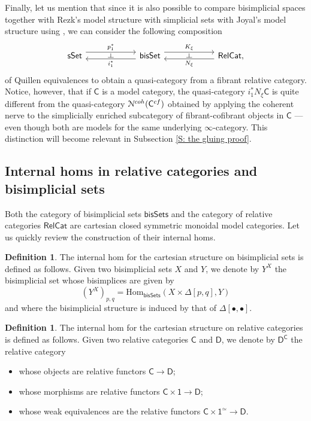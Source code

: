 \documentclass{proc-l}
\renewcommand{\mathcal}{\EuScript}
\theoremstyle{plain}
\theoremstyle{definition}
\newtheorem{definition}[{theorem}]{Definition}
\theoremstyle{remark}
\begin{document}
Finally, let us mention that since it is also possible to compare bisimplicial spaces together with Rezk's model structure with simplicial sets with Joyal's model structure using \cite{JoaylTierney07}, we can consider the following composition
\[
\begin{tikzcd}[column sep=5pc,row sep=3pc]
\mathsf{sSet}   \arrow[r, shift left=1.1ex, "p_1^*"{name=A}]
&\mathsf{bisSet} \arrow[r, shift left=1.1ex, "K_{\xi}"{name=F}] \arrow[l, shift left=.75ex, "i_1^*"{name=B}] & \mathsf{RelCat} , \arrow[l, shift left=.75ex, "N_{\xi}"{name=U}]
\arrow[phantom, from=F, to=U, , "\dashv" rotate=-90] \arrow[phantom, from=A, to=B, , "\dashv" rotate=-90]
\end{tikzcd}
\]
of Quillen equivalences to obtain a quasi-category from a fibrant relative category. Notice, however, that if $\mathsf{C}$ is a model category, the quasi-category $i_1^* N_\xi\mathsf{C}$ is quite different from the quasi-category $\mathcal{N}^{coh}(\mathsf{C}^{cf})$ obtained by applying the coherent nerve to the simplicially enriched subcategory of fibrant-cofibrant objects in $\mathsf{C}$ --- even though both are models for the same underlying $\infty$-category. This distinction will become relevant in Subsection \ref{S: the gluing proof}.

\subsection{Internal homs in relative categories and bisimplicial sets}%
\label{Section:A.2}\label{subsection: internal homs}
Both the category of bisimplicial sets $\mathsf{bisSets}$ and the category of relative categories $\mathsf{RelCat}$ are cartesian closed symmetric monoidal model categories. Let us  quickly review the construction of their internal homs.

\begin{definition}%
\label{Definition:A.5}The internal hom for the cartesian structure on bisimplicial sets is defined as follows. Given two bisimplicial sets $X$ and $Y$, we denote by $Y^X$ the bisimplicial set whose bisimplices are given by
\[
(Y^X)_{p,q} = \mathrm{Hom}_{\mathsf{bisSets}}(X\times\Delta[p,q],Y)
\]
and where the bisimplicial structure is induced by that of $\Delta[\bullet,\bullet]$.
\end{definition}

\begin{definition}%
\label{Definition:A.6}The internal hom for the cartesian structure on relative categories is defined as follows. Given two relative categories $\mathsf{C}$ and $\mathsf{D}$, we denote by $\mathsf{D}^\mathsf{C}$ the relative category
\begin{itemize}[label=-]
\item whose objects are relative functors $\mathsf{C} \rightarrow \mathsf{D}$;
\item whose morphisms are relative functors $\mathsf{C}\times\mathsf{1}\rightarrow \mathsf{D}$;
\item whose weak equivalences are the relative functors $\mathsf{C}\times\mathsf{1}^{\simeq}\rightarrow \mathsf{D}$.
\end{itemize}
\end{definition}
\end{document}
